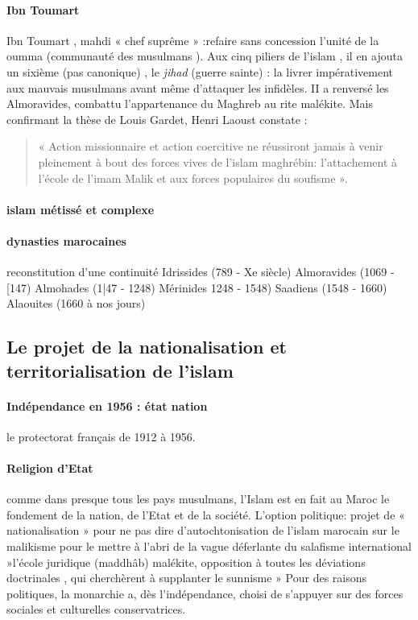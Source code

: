 \paragraph{Ibn Toumart} \label{theo:IbnToumart1}  Ibn Toumart , mahdi « chef suprême » :refaire sans concession l'unité de la oumma (communauté des musulmans ).
Aux cinq piliers de l'islam , il en ajouta un sixième (pas canonique) , le \textit{jihad} (guerre sainte) : la livrer impérativement aux mauvais musulmans avant même d'attaquer les infidèles.
 II a renversé les Almoravides, combattu l'appartenance du Maghreb au rite malékite.
 Mais confirmant la thèse de Louis Gardet, Henri Laoust constate :\begin{quote}
     « Action missionnaire et action coercitive ne réussiront jamais à venir pleinement à bout des forces vives de l'islam maghrébin: l'attachement à l'école de l'imam Malik et aux forces populaires du soufisme ».
 \end{quote} 

\paragraph{islam métissé et complexe}


\paragraph{dynasties marocaines} reconstitution d'une continuité
 Idrissides (789 - Xe siècle)
 Almoravides (1069 - [147)
 Almohades (1|47 - 1248)
 Mérinides 1248 - 1548)
Saadiens (1548 - 1660)
  Alaouites (1660 à nos jours)

\subsection{Le projet de la nationalisation et territorialisation de l'islam}

\paragraph{Indépendance en 1956 : état nation} le protectorat français de 1912 à 1956.

\paragraph{Religion d'Etat}
   comme dans presque tous les pays musulmans, l'Islam est en fait au Maroc le fondement de la nation, de l'Etat et de la société.
 L'option politique:
projet
de « nationalisation » pour ne pas dire d'autochtonisation de l'islam marocain sur le malikisme pour le mettre à l'abri de la vague déferlante du salafisme international »l'école juridique (maddhâb) malékite, opposition à toutes les déviations doctrinales , qui cherchèrent à supplanter le sunnisme » Pour des raisons politiques, la monarchie a, dès l'indépendance, choisi de s'appuyer sur des forces sociales et culturelles conservatrices.




